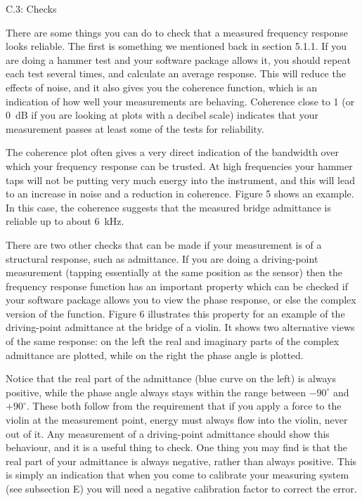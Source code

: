   C.3: Checks 

  There are some things you can do to check that a measured frequency response 
  looks reliable. The first is something we mentioned back in section 5.1.1. If 
  you are doing a hammer test and your software package allows it, you should 
  repeat each test several times, and calculate an average response. This will 
  reduce the effects of noise, and it also gives you the coherence function, 
  which is an indication of how well your measurements are behaving. Coherence 
  close to 1 (or 0~dB if you are looking at plots with a decibel scale) 
  indicates that your measurement passes at least some of the tests for 
  reliability. 

  The coherence plot often gives a very direct indication of the bandwidth over 
  which your frequency response can be trusted. At high frequencies your hammer 
  taps will not be putting very much energy into the instrument, and this will 
  lead to an increase in noise and a reduction in coherence. Figure 5 shows an 
  example. In this case, the coherence suggests that the measured bridge 
  admittance is reliable up to about 6~kHz. 

  There are two other checks that can be made if your measurement is of a 
  structural response, such as admittance. If you are doing a driving-point 
  measurement (tapping essentially at the same position as the sensor) then the 
  frequency response function has an important property which can be checked if 
  your software package allows you to view the phase response, or else the 
  complex version of the function. Figure 6 illustrates this property for an 
  example of the driving-point admittance at the bridge of a violin. It shows 
  two alternative views of the same response: on the left the real and 
  imaginary parts of the complex admittance are plotted, while on the right the 
  phase angle is plotted. 

  Notice that the real part of the admittance (blue curve on the left) is 
  always positive, while the phase angle always stays within the range between 
  $-90^\circ$ and $+90^\circ$. These both follow from the requirement that if 
  you apply a force to the violin at the measurement point, energy must always 
  flow into the violin, never out of it. Any measurement of a driving-point 
  admittance should show this behaviour, and it is a useful thing to check. One 
  thing you may find is that the real part of your admittance is always 
  negative, rather than always positive. This is simply an indication that when 
  you come to calibrate your measuring system (see subsection E) you will need 
  a negative calibration factor to correct the error. 

